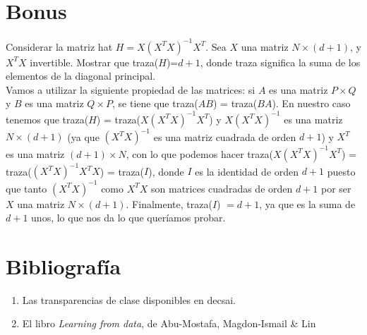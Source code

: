 \documentclass[12pt]{article}
\theoremstyle{definition}
\begin{document}
\section{Bonus}
\begin{pregunta}
Considerar la matriz hat $H=X(X^TX)^{-1}X^T$. Sea $X$ una matriz $N \times (d+1)$, y $X^TX$ invertible. Mostrar que traza($H$)=$d+1$, donde traza significa la suma de los elementos de la diagonal principal.\\

Vamos a utilizar la siguiente propiedad de las matrices: si  $A$ es una matriz $P \times Q$ y $B$ es una matriz $Q \times P$, se tiene que traza($AB$) = traza($BA$). En nuestro caso tenemos que traza($H$) = traza($X(X^TX)^{-1}X^T$) y $X(X^TX)^{-1}$ es una matriz $N \times (d+1)$ (ya que $(X^TX)^{-1}$ es una matriz cuadrada de orden $d+1$) y $X^T$ es una matriz $(d+1) \times N$, con lo que podemos hacer traza($X(X^TX)^{-1} X^T$) = traza($(X^TX)^{-1} X^TX$) = traza($I$), donde $I$ es la identidad de orden $d+1$ puesto que tanto $(X^TX)^{-1}$ como $X^TX$ son matrices cuadradas de orden $d+1$ por ser $X$ una matriz $N \times (d+1)$. Finalmente, traza($I$) $=d+1$, ya que es la suma de $d+1$ unos, lo que nos da lo que queríamos probar.

\end{pregunta}

\section{Bibliografía}
\begin{enumerate}
\item Las transparencias de clase disponibles en decsai.
\item El libro \textit{Learning from data}, de Abu-Mostafa, Magdon-Ismail \& Lin
\end{enumerate}
\end{document}
